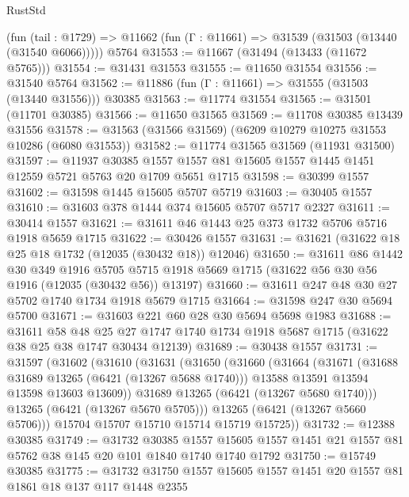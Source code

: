 \begin{lexlean}{RustStd}
\begin{coremodule}
    (fun (tail : @1729) => @11662 (fun (Γ : @11661) => @31539 (@31503 (@13440 (@31540 @6066)))))
    @5764
@31553 := @11667 (@31494 (@13433 (@11672 @5765)))
@31554 := @31431 @31553
@31555 := @11650 @31554
@31556 := @31540 @5764
@31562 := @11886 (fun (Γ : @11661) => @31555 (@31503 (@13440 @31556))) @30385
@31563 := @11774 @31554
@31565 := @31501 (@11701 @30385)
@31566 := @11650 @31565
@31569 := @11708 @30385 @13439 @31556
@31578 := @31563 (@31566 @31569) (@6209 @10279 @10275 @31553 @10286 (@6080 @31553))
@31582 := @11774 @31565 @31569 (@11931 @31500)
@31597 := @11937
    @30385
    @1557
    @1557
    @81
    @15605
    @1557
    @1445
    @1451
    @12559
    @5721
    @5763
    @20
    @1709
    @5651
    @1715
@31598 := @30399 @1557
@31602 := @31598 @1445 @15605 @5707 @5719
@31603 := @30405 @1557
@31610 := @31603 @378 @1444 @374 @15605 @5707 @5717 @2327
@31611 := @30414 @1557
@31621 := @31611 @46 @1443 @25 @373 @1732 @5706 @5716 @1918 @5659 @1715
@31622 := @30426 @1557
@31631 := @31621 (@31622 @18 @25 @18 @1732 (@12035 (@30432 @18)) @12046)
@31650 := @31611
    @86
    @1442
    @30
    @349
    @1916
    @5705
    @5715
    @1918
    @5669
    @1715
    (@31622 @56 @30 @56 @1916 (@12035 (@30432 @56)) @13197)
@31660 := @31611 @247 @48 @30 @27 @5702 @1740 @1734 @1918 @5679 @1715
@31664 := @31598 @247 @30 @5694 @5700
@31671 := @31603 @221 @60 @28 @30 @5694 @5698 @1983
@31688 := @31611
    @58
    @48
    @25
    @27
    @1747
    @1740
    @1734
    @1918
    @5687
    @1715
    (@31622 @38 @25 @38 @1747 @30434 @12139)
@31689 := @30438 @1557
@31731 := @31597
    (@31602
      (@31610
        (@31631
          (@31650
            (@31660
              (@31664
                (@31671
                  (@31688 @31689 @13265 (@6421 (@13267 @5688 @1740)))
                  @13588
                  @13591
                  @13594
                  @13598
                  @13603
                  @13609))
              @31689
              @13265
              (@6421 (@13267 @5680 @1740)))
            @13265
            (@6421 (@13267 @5670 @5705)))
          @13265
          (@6421 (@13267 @5660 @5706)))
        @15704
        @15707
        @15710
        @15714
        @15719
        @15725))
@31732 := @12388 @30385
@31749 := @31732
    @30385
    @1557
    @15605
    @1557
    @1451
    @21
    @1557
    @81
    @5762
    @38
    @145
    @20
    @101
    @1840
    @1740
    @1740
    @1792
@31750 := @15749 @30385
@31775 := @31732
    @31750
    @1557
    @15605
    @1557
    @1451
    @20
    @1557
    @81
    @1861
    @18
    @137
    @117
    @1448
    @2355

\end{coremodule}
\end{lexlean}
